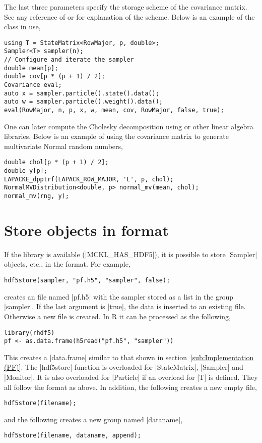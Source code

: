 The last three parameters specify the storage scheme of the covariance matrix.
See any reference of \blas or \lapack for explanation of the scheme. Below is
an example of the class in use,
\begin{verbatim}
using T = StateMatrix<RowMajor, p, double>;
Sampler<T> sampler(n);
// Configure and iterate the sampler
double mean[p];
double cov[p * (p + 1) / 2];
Covariance eval;
auto x = sampler.particle().state().data();
auto w = sampler.particle().weight().data();
eval(RowMajor, n, p, x, w, mean, cov, RowMajor, false, true);
\end{verbatim}
One can later compute the Cholesky decomposition using \lapack or other linear
algebra libraries. Below is an example of using the covariance matrix to
generate multivariate Normal random numbers,
\begin{verbatim}
double chol[p * (p + 1) / 2];
double y[p];
LAPACKE_dpptrf(LAPACK_ROW_MAJOR, 'L', p, chol);
NormalMVDistribution<double, p> normal_mv(mean, chol);
normal_mv(rng, y);
\end{verbatim}

\section{Store objects in \texorpdfstring{\hdf}{HDF5} format}
\label{sec:Store objects in HDF5 format}

If the \hdf library is available (|MCKL_HAS_HDF5|), it is possible to store
|Sampler| objects, etc., in the \hdf format. For example,
\begin{verbatim}
hdf5store(sampler, "pf.h5", "sampler", false);
\end{verbatim}
creates an \hdf file named |pf.h5| with the sampler stored as a list in the
group |sampler|. If the last argument is |true|, the data is inserted to an
existing file. Otherwise a new file is created. In R it can be processed as the
following,
\begin{verbatim}
library(rhdf5)
pf <- as.data.frame(h5read("pf.h5", "sampler"))
\end{verbatim}
This creates a |data.frame| similar to that shown in
section~\ref{sub:Implementation (PF)}. The |hdf5store| function is overloaded
for |StateMatrix|, |Sampler| and |Monitor|. It is also overloaded for
|Particle| if an overload for |T| is defined. They all follow the format as
above. In addition, the following creates a new empty \hdf file,
\begin{verbatim}
hdf5store(filename);
\end{verbatim}
and the following creates a new group named |dataname|,
\begin{verbatim}
hdf5store(filename, dataname, append);
\end{verbatim}


